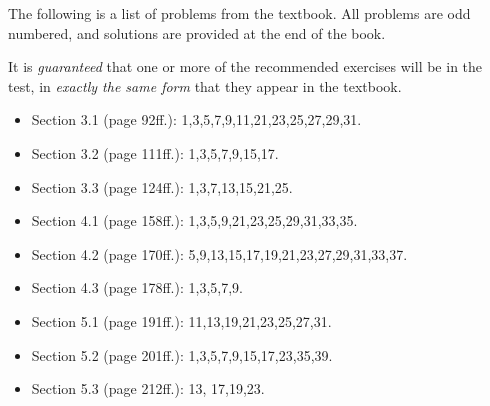 \documentclass[12pt]{article}
\begin{document}
\sffamily

The following is a list of problems from the textbook. All problems are odd numbered, and solutions are provided at the end of the book.

It is \emph{guaranteed} that one or more of the recommended exercises will be in the test, in \emph{exactly the same form} that they appear in the textbook.

\begin{itemize} 
\item Section 3.1 (page 92ff.): 1,3,5,7,9,11,21,23,25,27,29,31. 
\item Section 3.2 (page 111ff.): 1,3,5,7,9,15,17.  
\item Section 3.3 (page 124ff.): 1,3,7,13,15,21,25. 
\item Section 4.1 (page 158ff.): 1,3,5,9,21,23,25,29,31,33,35. 
\item Section 4.2 (page 170ff.): 5,9,13,15,17,19,21,23,27,29,31,33,37. 
\item Section 4.3 (page 178ff.): 1,3,5,7,9. 
\item Section 5.1 (page 191ff.): 11,13,19,21,23,25,27,31.
\item Section 5.2 (page 201ff.): 1,3,5,7,9,15,17,23,35,39.
\item Section 5.3 (page 212ff.): 13, 17,19,23.
\end{itemize}
\end{document}
